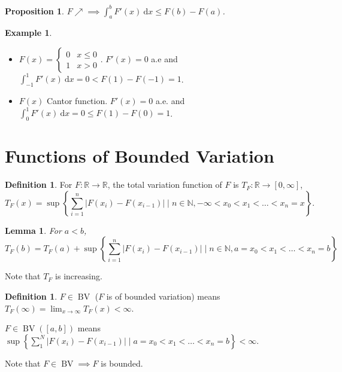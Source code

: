\documentclass{report}
\newcommand{\R}{\mathbb{R}}
\newcommand{\N}{\mathbb{N}}
\def \BV {\operatorname{BV}}
\newcommand{\df}{\ \mathrm{d}}
\newtheorem{lemma}[theorem]{Lemma}
\newtheorem{proposition}[theorem]{Proposition}
\theoremstyle{definition}
\newtheorem{definition}[theorem]{Definition}
\newtheorem{example}[theorem]{Example}
\theoremstyle{remark}
\newcommand{\fnl}{\parbox[t]{0\linewidth}{}}
\begin{document}
\begin{proposition}
	$F \nearrow \implies \displaystyle \int_a^b F'(x) \df x \leq F(b) - F(a)$.
\end{proposition}

\begin{example}\fnl
	\begin{itemize}
		\item $F(x) = \begin{cases}
			0 & x \leq 0 \\
			1 & x > 0
		\end{cases}$. $F'(x) = 0$ a.e and $\displaystyle \int_{-1}^1 F'(x) \df x = 0 < F(1) - F(-1) = 1$.
		\item $F(x)$ Cantor function. $F'(x) = 0$ a.e. and $\displaystyle \int_0^1 F'(x)\df x = 0 \leq F(1) - F(0) = 1$.
	\end{itemize}
\end{example}

\section{Functions of Bounded Variation}
\begin{definition}
	For $F: \R \to \R$, the total variation function of $F$ is $T_F: \R \to [0, \infty]$, \[
		T_F(x) = \sup\left\{\sum_{i=1}^n |F(x_i) - F(x_{i-1})| \mid n \in \N, -\infty < x_0 < x_1 < \ldots < x_n = x\right\}.
	\]
\end{definition}
\begin{lemma}
	For $a < b$, \[
		T_F(b) = T_F(a) + \sup\left\{\sum_{i=1}^n |F(x_i) - F(x_{i-1})| \mid n \in \N, a = x_0 < x_1 < \ldots < x_n = b\right\}
	\]
\end{lemma}
Note that $T_F$ is increasing.

\begin{definition}
	$F \in \BV$ ($F$ is of bounded variation) means $T_F(\infty) = \lim_{x \to \infty}T_F(x) < \infty$. 

	$F \in \BV([a, b])$ means $\sup\left\{\sum_{1}^N |F(x_i) - F(x_{i-1})| \mid a = x_0 < x_1 < \ldots < x_n = b\right\} < \infty$.
\end{definition}
Note that $F \in \BV \implies F$ is bounded.
\end{document}
